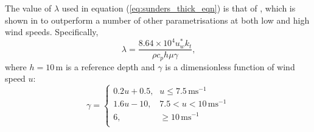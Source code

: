 \documentclass[../tex_main/NEMO_manual]{subfiles}
\begin{document}
The value of $\lambda$ used in equation (\autoref{eq:sunders_thick_eqn}) is that of \citet{Artale_al_JGR02},
which is shown in \citet{Tu_Tsuang_GRL05} to outperform a number of other parametrisations at
both low and high wind speeds.
Specifically,
\begin{equation}
\label{eq:artale_lambda_eqn}
\lambda = \frac{ 8.64\times10^4 u^*_{w} k_t }{ \rho c_p h \mu \gamma }\mbox{,}
\end{equation}
where $h=10$\,m is a reference depth and
$\gamma$ is a dimensionless function of wind speed $u$:
\begin{equation}
\label{eq:artale_gamma_eqn}
\gamma = \left\{ \begin{matrix}
                     0.2u+0.5\mbox{,} & u \le 7.5\,\mbox{ms}^{-1} \\
                     1.6u-10\mbox{,} & 7.5 < u < 10\,\mbox{ms}^{-1} \\
                     6\mbox{,} & \ge 10\,\mbox{ms}^{-1} \\
                 \end{matrix}
          \right.
\end{equation}
\end{document}
